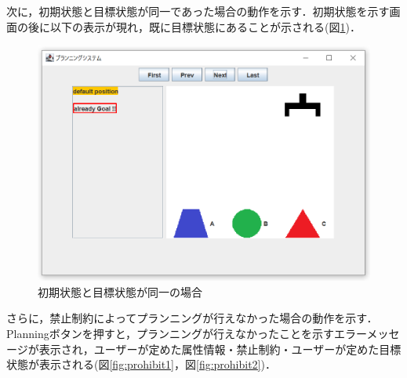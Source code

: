 \documentclass[uplatex,12pt]{jsarticle}
\begin{document}
\clearpage
次に，初期状態と目標状態が同一であった場合の動作を示す．初期状態を示す画面の後に以下の表示が現れ，既に目標状態にあることが示される(図\ref{fig:page17})．
\begin{figure}[htbp]
  \begin{center}
    \includegraphics[scale=0.6]{images/page17.PNG}
    \caption{初期状態と目標状態が同一の場合}
    \label{fig:page17}
  \end{center}
\end{figure}

さらに，禁止制約によってプランニングが行えなかった場合の動作を示す．Planningボタンを押すと，プランニングが行えなかったことを示すエラーメッセージが表示され，ユーザーが定めた属性情報・禁止制約・ユーザーが定めた目標状態が表示される(図\ref{fig:prohibit1}，図\ref{fig:prohibit2})．\\
\end{document}
